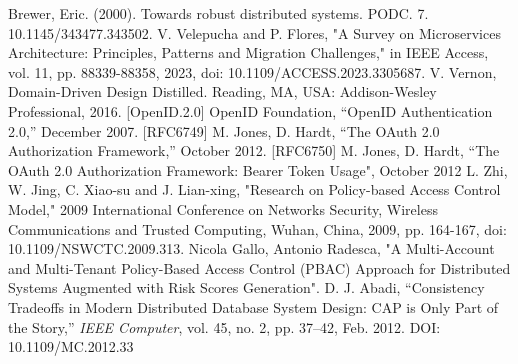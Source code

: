 \documentclass[letterpaper, 10 pt, conference]{ieeeconf}  %
\begin{document}

\begin{thebibliography}{99}
 Brewer, Eric. (2000). Towards robust distributed systems. PODC. 7. 10.1145/343477.343502. 
 V. Velepucha and P. Flores, "A Survey on Microservices Architecture: Principles, Patterns and Migration Challenges," in IEEE Access, vol. 11, pp. 88339-88358, 2023, doi: 10.1109/ACCESS.2023.3305687.
 V. Vernon, Domain-Driven Design Distilled. Reading, MA, USA: Addison-Wesley Professional, 2016.
 [OpenID.2.0] OpenID Foundation, “OpenID Authentication 2.0,” December 2007.
 [RFC6749]	M. Jones, D. Hardt, “The OAuth 2.0 Authorization Framework,” October 2012.
 [RFC6750]	M. Jones, D. Hardt, “The OAuth 2.0 Authorization Framework: Bearer Token Usage", October 2012
 L. Zhi, W. Jing, C. Xiao-su and J. Lian-xing, "Research on Policy-based Access Control Model," 2009 International Conference on Networks Security, Wireless Communications and Trusted Computing, Wuhan, China, 2009, pp. 164-167, doi: 10.1109/NSWCTC.2009.313.
 Nicola Gallo, Antonio Radesca, "A Multi-Account and Multi-Tenant Policy-Based Access Control (PBAC) Approach for Distributed Systems Augmented with Risk Scores Generation".
 D. J. Abadi, “Consistency Tradeoffs in Modern Distributed Database System Design: CAP is Only Part of the Story,” \emph{IEEE Computer}, vol. 45, no. 2, pp. 37–42, Feb. 2012. DOI: 10.1109/MC.2012.33
\end{thebibliography}
\end{document}
